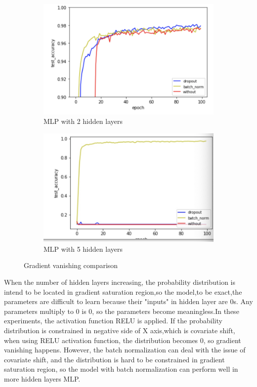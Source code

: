 \documentclass[12pt,letterpaper]{article}
\begin{document}
\begin{figure}[h]
\centering
\begin{subfigure}{.49\textwidth}
  \centering
  \includegraphics[width=.95\linewidth]{MAP_2hidden_300batchsize.png}
  \caption{\small MLP with 2 hidden layers}
  \label{fig:sub1}
\end{subfigure}%
\begin{subfigure}{.49\textwidth}
  \centering
  \includegraphics[width=.95\linewidth]{MAP_hidden5.png}
  \caption{\small MLP with 5 hidden layers}
  \label{fig:sub2}
\end{subfigure}
\caption{\small Gradient vanishing comparison}
\label{fig:GDV}
\end{figure}

When the number of hidden layers increasing, the probability distribution is intend to be located in gradient saturation region,so the model,to be exact,the parameters are difficult to learn because their "inputs" in hidden layer are 0s. Any parameters multiply to 0 is 0, so the parameters become meaningless.In these experiments, the activation function RELU is applied. If the probability distribution is constrained in negative side of X axis,which is covariate shift, when using RELU activation function, the distribution becomes 0, so gradient vanishing happens. However, the batch normalization can deal with the issue of covariate shift, and the distribution is hard to be constrained in gradient saturation region, so the model with batch normalization can perform well in more hidden layers MLP.
\end{document}
